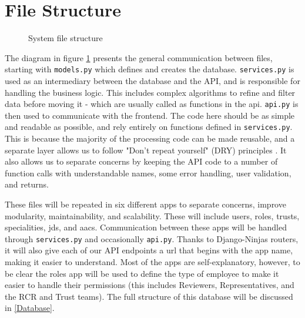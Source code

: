 \section{File Structure} \label{File Structure}
\begin{figure}[h]
\centering
{}
\vspace{-20pt}
\caption{System file structure}
\label{fig:file-design}
\vspace{-5pt}
\end{figure}
The diagram in figure \ref{fig:file-design} presents the general communication between files, starting with \texttt{models.py} which defines and creates the database. \texttt{services.py} is used as an intermediary between the database and the API, and is responsible for handling the business logic. This includes complex algorithms to refine and filter data before moving it - which are usually called as functions in the api. \texttt{api.py} is then used to communicate with the frontend. The code here should be as simple and readable as possible, and rely entirely on functions defined in \texttt{services.py}. This is because the majority of the processing code can be made reusable, and a separate layer allows us to follow "Don't repeat yourself" (DRY) principles \parencite{thomas_pragmatic_2019}. It also allows us to separate concerns \parencite{reade_elements_1989} by keeping the API code to a number of function calls with understandable names, some error handling, user validation, and returns.

These files will be repeated in six different apps to separate concerns, improve modularity, maintainability, and scalability. These will include users, roles, trusts, specialities, jds, and aacs. Communication between these apps will be handled through \texttt{services.py} and occasionally \texttt{api.py}. Thanks to Django-Ninjas routers, it will also give each of our API endpoints a url that begins with the app name, making it easier to understand. Most of the apps are self-explanatory, however, to be clear the roles app will be used to define the type of employee to make it easier to handle their permissions (this includes Reviewers, Representatives, and the RCR and Trust teams). The full structure of this database will be discussed in \ref{Database}.

